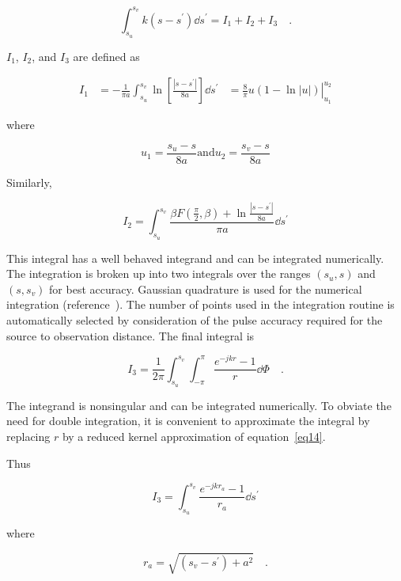 \documentclass[12pt]{article}
\begin{document}
\begin{equation}
\int_{s_u}^{s_v} k(s-s^\prime)\dd{s^\prime} = I_1 + I_2 + I_3
\quad.
\label{eq20}
\end{equation}

$I_1$, $I_2$, and $I_3$ are defined as

\begin{equation}
\begin{aligned}
I_1 & = -\frac{1}{\pi a}\int_{s_u}^{s_v}
        \ln\left[\frac{|s-s^\prime|}{8a}\right] \dd{s^\prime}
    & = \left.\frac{8}{\pi} u(1-\ln|u|)\right|_{u_1}^{u_2}
\end{aligned}
\label{eq21}
\end{equation}

where

\[ u_1 = \frac{s_u - s}{8a} \mbox{and} u_2 = \frac{s_v - s}{8a}
\]

Similarly,

\begin{equation}
I_2 = \int_{s_u}^{s_v}
\frac{\beta F\left(\frac{\pi}{2}, \beta\right)
+ \ln\frac{|s-s^\prime|}{8a}}{\pi a}\dd{s^\prime}
\label{eq22}
\end{equation}

This integral has a well behaved integrand and can be integrated
numerically. The integration is broken up into two integrals over the
ranges $(s_u, s)$ and $(s, s_v)$ for best accuracy. Gaussian quadrature
is used for the numerical integration (reference~\cite{r7}). The number
of points used in the integration routine is automatically selected by
consideration of the pulse accuracy required for the source to
observation distance. The final integral is

\begin{equation}
I_3 = \frac{1}{2\pi}\int_{s_u}^{s_v}\int_{-\pi}^\pi\frac{e^{-jkr}-1}{r}\dd{\Phi}
\quad.
\label{eq23}
\end{equation}

The integrand is nonsingular and can be integrated numerically. To
obviate the need for double integration, it is convenient to approximate
the integral by replacing $r$ by a reduced kernel approximation of
equation~\eqref{eq14}.

Thus

\begin{equation}
I_3 = \int_{s_u}^{s_v}\frac{e^{-jkr_a}-1}{r_a}\dd{s^\prime}
\label{eq24}
\end{equation}

where

\[
r_a = \sqrt{(s_v - s^\prime) + a^2}
\quad.
\]
\end{document}

